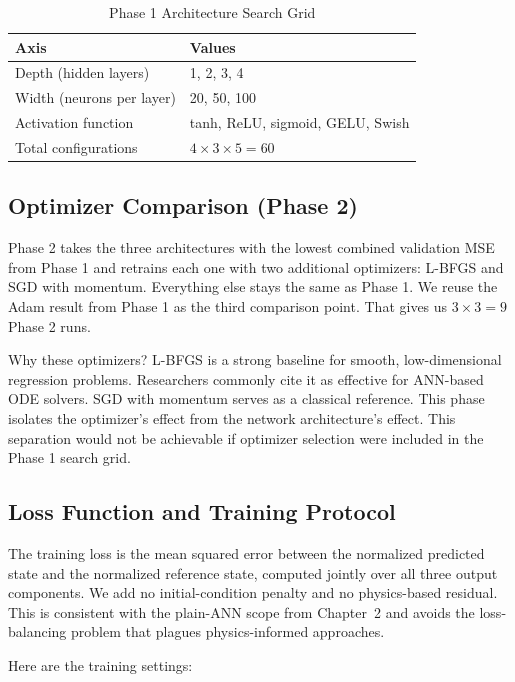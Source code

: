 \begin{table}[H]
\centering
\caption{Phase 1 Architecture Search Grid}
\label{tab:phase1grid}
\renewcommand{\arraystretch}{1.2}
\begin{tabular}{|l|l|}
\hline
\textbf{Axis} & \textbf{Values} \\
\hline
Depth (hidden layers) & 1, 2, 3, 4 \\
\hline
Width (neurons per layer) & 20, 50, 100 \\
\hline
Activation function & tanh, ReLU, sigmoid, GELU, Swish \\
\hline
Total configurations & $4 \times 3 \times 5 = 60$ \\
\hline
\end{tabular}
\end{table}

\subsection{Optimizer Comparison (Phase 2)}

Phase 2 takes the three architectures with the lowest combined validation MSE from Phase 1 and retrains each one with two additional optimizers: L-BFGS and SGD with momentum. Everything else stays the same as Phase 1. We reuse the Adam result from Phase 1 as the third comparison point. That gives us $3 \times 3 = 9$ Phase 2 runs.

Why these optimizers? L-BFGS is a strong baseline for smooth, low-dimensional regression problems. Researchers commonly cite it as effective for ANN-based ODE solvers. SGD with momentum serves as a classical reference. This phase isolates the optimizer's effect from the network architecture's effect. This separation would not be achievable if optimizer selection were included in the Phase 1 search grid.

\subsection{Loss Function and Training Protocol}

The training loss is the mean squared error between the normalized predicted state and the normalized reference state, computed jointly over all three output components. We add no initial-condition penalty and no physics-based residual. This is consistent with the plain-ANN scope from Chapter~2 and avoids the loss-balancing problem that plagues physics-informed approaches.

Here are the training settings:

